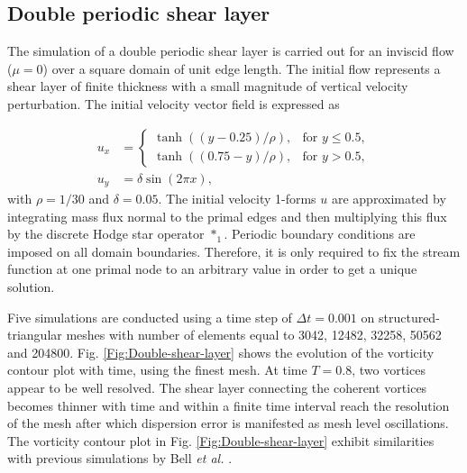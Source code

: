 \documentclass[final,12pt,times]{elsarticle}
\begin{document}

\subsection{Double periodic shear layer}
\label{subsec:shear-layer}
The simulation of a double periodic shear layer is carried out for an inviscid flow ($\mu = 0$) over a square domain of unit edge length. The initial flow represents a shear layer of finite thickness with a small magnitude of vertical velocity perturbation. The initial velocity vector field is expressed as \cite{bell1989second} 

\begin{equation}
\label{eq:double-shear-layer}
\begin{aligned}
u_x &=\begin{cases}
    \tanh ((y-0.25)/\rho), & \text{for $y \leq 0.5$},\\
    \tanh ((0.75-y)/\rho), & \text{for $y > 0.5$},
  \end{cases} \\
u_y &= \delta \sin(2\pi x),   
\end{aligned}
\end{equation}
with $\rho = 1/30$ and $\delta = 0.05$. The initial velocity 1-forms $u$ are approximated by integrating mass flux normal to the primal edges and then multiplying this flux by the discrete Hodge star operator $\ast_1$. Periodic boundary conditions are imposed on all domain boundaries. Therefore, it is only required to fix the stream function at one primal node to an arbitrary value in order to get a unique solution. 

Five simulations are conducted using a time step of $\Delta t = 0.001$ on structured-triangular meshes with number of elements equal to 3042, 12482, 32258, 50562 and 204800. Fig. \ref{Fig:Double-shear-layer} shows the evolution of the vorticity contour plot with time, using the finest mesh. At time $T=0.8$, two vortices appear to be well resolved. The shear layer connecting the coherent vortices becomes thinner with time and within a finite time interval reach the resolution of the mesh after which dispersion error is manifested as mesh level oscillations. The vorticity contour plot in Fig. \ref{Fig:Double-shear-layer} exhibit similarities with previous simulations by Bell \textit{et al.} \cite{bell1989second}.
\end{document}
